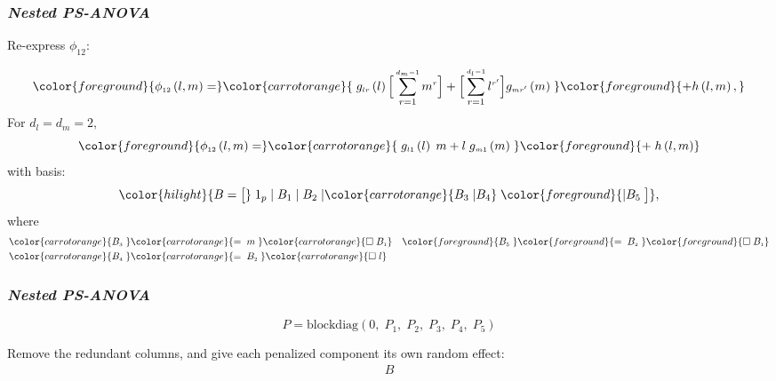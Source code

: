 \documentclass[12pt]{beamer}
\newcommand{\newmaththought}[1]{{ \color{foreground} {#1}}}
\newcommand{\carrotorangemath}[1]{{ \color{carrotorange} {#1}}}
\newcommand{\ms}{\scriptscriptstyle}
\begin{document}


\begin{frame}
\frametitle{\emph{Nested PS-ANOVA}}

Re-express $\phi_{\ms{12}}$:

\begin{align*}
\newmaththought{ \phi_{\ms{12}}\left(l,m\right)  =} \carrotorangemath{\; g_{\ms lr}\left(l\right) \Big[ \sum_{r=1}^{\ms{d_m-1}} m^{\ms r}\Big] + \Big[ \sum_{r=1}^{\ms{d_l-1}} l^{\ms r^\prime} \Big] g_{\ms mr^\prime}\left(m\right)\;}  \newmaththought{+ h\left( l,m \right), } 
\end{align*}
\noindent
For $d_l = d_m = 2$,
\[
\newmaththought{ \phi_{\ms{12}}\left(l,m\right)  =} \carrotorangemath{\; g_{\ms l1}\left(l\right) \; m+ l \; g_{\ms m1}\left(m\right)\;}\newmaththought{ + \; h\left( l,m \right) } 
\]
with basis:
\begin{equation} \label{eq:nested-SANOVA-basis-matrix}
\color{hilight}{B = \big[ } \; 1_p \; \vert \;  B_1  \; \vert \;   B_2 \; \vert \carrotorangemath{ B_3 \; \vert B_4 }\;\newmaththought{ \vert B_5 \; \big]},
\end{equation}
\noindent
where
\begin{align*}
\carrotorangemath{B_{\ms 3}\;} &\carrotorangemath{= \;m \;} \carrotorangemath{ \square \;  B_{\ms 1}}  &  \newmaththought{B_{\ms 5}\;}\newmaththought{=\; B_{\ms 2} \;} \newmaththought{ \square \; B_{\ms 1} } \\
 \carrotorangemath{B_{\ms 4}\;}&\carrotorangemath{=\; B_{\ms 2} \;} \carrotorangemath{ \square \; l } &
\end{align*}


\end{frame}






\begin{frame}
\frametitle{\emph{Nested PS-ANOVA}}

\begin{equation*}
P = \mbox{blockdiag}\left(0,\;P_1,\;P_2,\;P_3,\;P_4,\;P_5\right)
\end{equation*}


Remove the redundant columns, and give each penalized component its own random effect:
\begin{align*}
B
\end{align*}


\end{frame}
\end{document}
